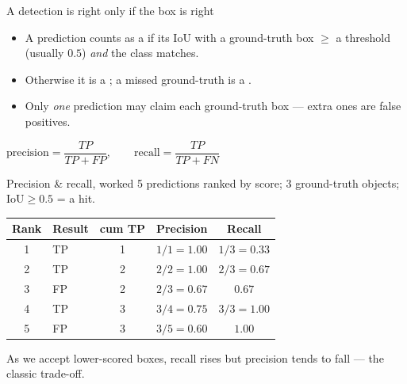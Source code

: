 \documentclass[10pt,aspectratio=169]{beamer}
\begin{document}
\begin{frame}{A detection is right only if the box is right}
  \begin{itemize}
    \item A prediction counts as a  if its IoU with a ground-truth box $\ge$ a threshold (usually $0.5$) \emph{and} the class matches.
    \item Otherwise it is a ; a missed ground-truth is a .
    \item Only \emph{one} prediction may claim each ground-truth box --- extra ones are false positives.
  \end{itemize}
  \begin{mathbox}
    $\text{precision}=\dfrac{TP}{TP+FP}, \qquad \text{recall}=\dfrac{TP}{TP+FN}$
  \end{mathbox}
\end{frame}

\begin{frame}{Precision \& recall, worked}
  5 predictions ranked by score; 3 ground-truth objects; IoU$\ge0.5$ = a hit.
  \begin{center}
  \begin{tabular}{@{}clccc@{}}
    \toprule
    \textbf{Rank} & \textbf{Result} & \textbf{cum TP} & \textbf{Precision} & \textbf{Recall} \\
    \midrule
    1 & TP & 1 & $1/1=1.00$ & $1/3=0.33$ \\
    2 & TP & 2 & $2/2=1.00$ & $2/3=0.67$ \\
    3 & FP & 2 & $2/3=0.67$ & $0.67$ \\
    4 & TP & 3 & $3/4=0.75$ & $3/3=1.00$ \\
    5 & FP & 3 & $3/5=0.60$ & $1.00$ \\
    \bottomrule
  \end{tabular}
  \end{center}
  As we accept lower-scored boxes, recall rises but precision tends to fall --- the classic trade-off.
\end{frame}
\end{document}
